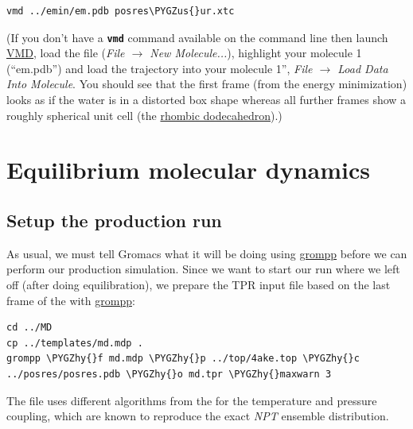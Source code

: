 \documentclass[letterpaper,10pt,english]{sphinxmanual}
\def\PYGZus{\char`\_}
\def\PYGZhy{\char`\-}
\begin{document}
\begin{Verbatim}[commandchars=\\\{\}]
vmd ../emin/em.pdb posres\PYGZus{}ur.xtc
\end{Verbatim}

(If you don't have a \textbf{\texttt{vmd}} command available on the command
line then launch \href{http://www.ks.uiuc.edu/Research/vmd/}{VMD}, load the  file
(\emph{File \(\rightarrow\) New Molecule...}), highlight your molecule 1
(``em.pdb'') and load the  trajectory into your
molecule 1'', \emph{File \(\rightarrow\) Load Data Into Molecule}. You
should see that the first frame (from the energy minimization) looks
as if the water is in a distorted box shape whereas all further frames
show a roughly spherical unit cell (the \href{http://mathworld.wolfram.com/RhombicDodecahedron.html}{rhombic dodecahedron}).)


\chapter{Equilibrium molecular dynamics}
\label{equilibrium_MD:equilibrium-md}\label{equilibrium_MD::doc}\label{equilibrium_MD:equilibrium-molecular-dynamics}\label{equilibrium_MD:atom-record-of-a-pdb-file}

\section{Setup the production run}
\label{equilibrium_MD:setup-the-production-run}
As usual, we must tell Gromacs what it will be doing using \href{http://manual.gromacs.org/current/online/grompp.html}{grompp}
before we can perform our production simulation. Since we want to
start our run where we left off (after doing equilibration), we
prepare the TPR input file based on the last frame of the
{\hyperref[position_restraints_MD:position-restraints]{\emph{}}} with \href{http://manual.gromacs.org/current/online/grompp.html}{grompp}:

\begin{Verbatim}[commandchars=\\\{\}]
cd ../MD
cp ../templates/md.mdp .
grompp \PYGZhy{}f md.mdp \PYGZhy{}p ../top/4ake.top \PYGZhy{}c ../posres/posres.pdb \PYGZhy{}o md.tpr \PYGZhy{}maxwarn 3
\end{Verbatim}

The  file uses different algorithms from the
{\hyperref[position_restraints_MD:position-restraints]{\emph{}}} for the temperature and pressure coupling,
which are known to reproduce the exact \emph{NPT} ensemble distribution.
\end{document}
